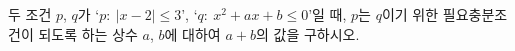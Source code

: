 두 조건 $p$, $q$가 `$p:\ |x-2|\le 3$', `$q:\ x^2+ax+b\le 0$'일 때, $p$는 $q$이기 위한 필요충분조건이 되도록 하는 상수 $a$, $b$에 대하여 $a+b$의 값을 구하시오.
